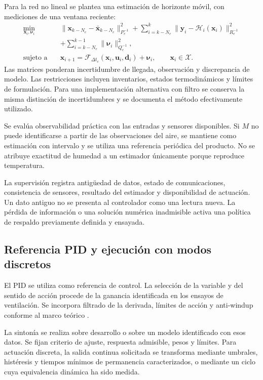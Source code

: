 Para la red no lineal se plantea una estimación de horizonte móvil, con mediciones de una ventana reciente:
\begin{equation}
\begin{split}
\min_{\mathbf x_i,\boldsymbol\nu_i}\quad&
\|\mathbf x_{k-N_e}-\bar{\mathbf x}_{k-N_e}\|_{P_e^{-1}}^2
+\sum_{i=k-N_e}^{k}\|
\mathbf y_i-\mathcal H_i(\mathbf x_i)
\|_{R_e^{-1}}^2\\
&+\sum_{i=k-N_e}^{k-1}\|\boldsymbol\nu_i\|_{Q_e^{-1}}^2,\\
\text{sujeto a}\quad&
\mathbf x_{i+1}=\mathcal F_{\Delta t_c}
(\mathbf x_i,\mathbf u_i,\mathbf d_i)+\boldsymbol\nu_i,
\qquad \mathbf x_i\in\mathcal X.
\end{split}
\label{met:mhe}
\end{equation}
Las matrices ponderan incertidumbre de llegada, observación y discrepancia de modelo. Las restricciones incluyen inventarios, estados termodinámicos y límites de formulación. Para una implementación alternativa con filtro se conserva la misma distinción de incertidumbres y se documenta el método efectivamente utilizado.

Se evalúa observabilidad práctica con las entradas y sensores disponibles. Si $M$ no puede identificarse a partir de las observaciones del aire, se mantiene como estimación con intervalo y se utiliza una referencia periódica del producto. No se atribuye exactitud de humedad a un estimador únicamente porque reproduce temperatura.

La supervisión registra antigüedad de datos, estado de comunicaciones, consistencia de sensores, resultado del estimador y disponibilidad de actuación. Un dato antiguo no se presenta al controlador como una lectura nueva. La pérdida de información o una solución numérica inadmisible activa una política de respaldo previamente definida y ensayada.

\subsection{Referencia PID y ejecución con modos discretos}
\label{met:pid}

El PID se utiliza como referencia de control. La selección de la variable y del sentido de acción procede de la ganancia identificada en los ensayos de ventilación. Se incorpora filtrado de la derivada, límites de acción y anti-windup conforme al marco teórico \cite{astrom1995,astrom2008}.

La sintonía se realiza sobre desarrollo o sobre un modelo identificado con esos datos. Se fijan criterio de ajuste, respuesta admisible, pesos y límites. Para actuación discreta, la salida continua solicitada se transforma mediante umbrales, histéresis y tiempos mínimos de permanencia caracterizados, o mediante un ciclo cuya equivalencia dinámica ha sido medida.

